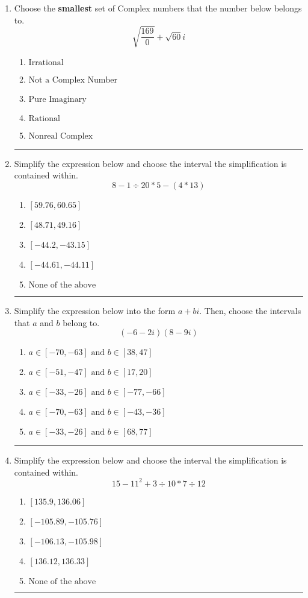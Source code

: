 \documentclass[14pt]{extbook}
\newcommand{\litem}[1]{\item#1\hspace*{-1cm}\rule{\textwidth}{0.4pt}}
\begin{document}
\begin{enumerate}
\litem{
Choose the \textbf{smallest} set of Complex numbers that the number below belongs to.\[ \sqrt{\frac{169}{0}}+\sqrt{60} i \]\begin{enumerate}[label=\Alph*.]
\item \( \text{Irrational} \)
\item \( \text{Not a Complex Number} \)
\item \( \text{Pure Imaginary} \)
\item \( \text{Rational} \)
\item \( \text{Nonreal Complex} \)

\end{enumerate} }
\litem{
Simplify the expression below and choose the interval the simplification is contained within.\[ 8 - 1 \div 20 * 5 - (4 * 13) \]\begin{enumerate}[label=\Alph*.]
\item \( [59.76, 60.65] \)
\item \( [48.71, 49.16] \)
\item \( [-44.2, -43.15] \)
\item \( [-44.61, -44.11] \)
\item \( \text{None of the above} \)

\end{enumerate} }
\litem{
Simplify the expression below into the form $a+bi$. Then, choose the intervals that $a$ and $b$ belong to.\[ (-6 - 2 i)(8 - 9 i) \]\begin{enumerate}[label=\Alph*.]
\item \( a \in [-70, -63] \text{ and } b \in [38, 47] \)
\item \( a \in [-51, -47] \text{ and } b \in [17, 20] \)
\item \( a \in [-33, -26] \text{ and } b \in [-77, -66] \)
\item \( a \in [-70, -63] \text{ and } b \in [-43, -36] \)
\item \( a \in [-33, -26] \text{ and } b \in [68, 77] \)

\end{enumerate} }
\litem{
Simplify the expression below and choose the interval the simplification is contained within.\[ 15 - 11^2 + 3 \div 10 * 7 \div 12 \]\begin{enumerate}[label=\Alph*.]
\item \( [135.9, 136.06] \)
\item \( [-105.89, -105.76] \)
\item \( [-106.13, -105.98] \)
\item \( [136.12, 136.33] \)
\item \( \text{None of the above} \)


\end{enumerate}}
\end{enumerate}
\end{document}
